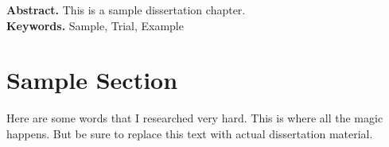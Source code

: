 \thispagestyle{empty}
\smallskip
\noindent \textbf{Abstract.} This is a sample dissertation chapter.\\ 

\smallskip
\noindent \textbf{Keywords.} Sample, Trial, Example 

\newpage

\section{Sample Section}
\label{sec:sample_section}

Here are some words that I researched very hard. This is where all the magic happens. But be sure to replace this text with actual dissertation material. 
